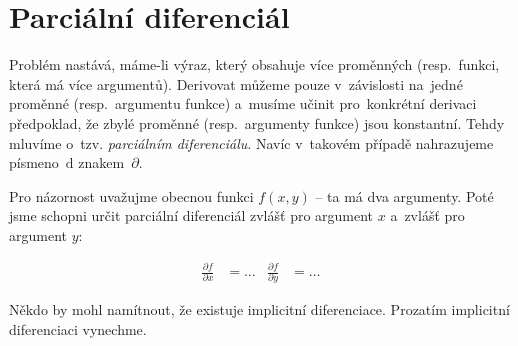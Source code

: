 \section{Parciální diferenciál}

Problém nastává, máme-li výraz, který obsahuje více proměnných (resp.\ funkci, která má více argumentů). Derivovat můžeme pouze v~závislosti na~jedné proměnné (resp.\ argumentu funkce) a~musíme učinit pro~konkrétní derivaci předpoklad, že zbylé proměnné (resp.\ argumenty funkce) jsou konstantní. Tehdy mluvíme o~tzv. \emph{parciálním diferenciálu}. Navíc v~takovém případě nahrazujeme písmeno~$\text{d}$ znakem~$\partial$.

Pro názornost uvažujme obecnou funkci $f(x, y)$ -- ta má dva argumenty. Poté jsme schopni určit parciální diferenciál zvlášť pro argument $x$ a~zvlášť pro argument $y$:

\begin{align*}
    \frac{\partial f}{\partial x} &= \ldots &
    \frac{\partial f}{\partial y} &= \ldots
\end{align*}

Někdo by mohl namítnout, že existuje implicitní diferenciace. Prozatím implicitní diferenciaci vynechme.